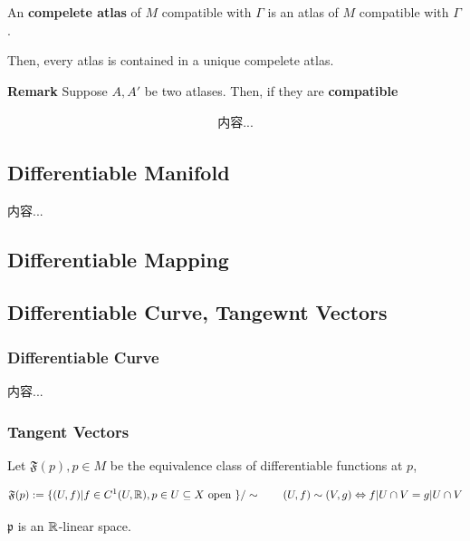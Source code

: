 \documentclass[Total.tex]{subfiles}
\begin{document}
				\begin{Def}
					An \textbf{compelete atlas} of $M$ compatible with $\Gamma$ is an atlas of $M$ compatible with $\Gamma$.
				\end{Def}
				
				Then, every atlas is contained in a unique compelete atlas. 
				
				\textbf{Remark} Suppose $A,A'$ be two atlases. Then, if they are \textbf{compatible}
				
				\begin{gather*}
					内容...
				\end{gather*}
				
				\subsection{Differentiable Manifold}
				
				\begin{Def}
					内容...
				\end{Def}
				
				\subsection{Differentiable Mapping}
				
				\subsection{Differentiable Curve, Tangewnt Vectors}
					
					\subsubsection{Differentiable Curve}
					
						\begin{Def}
							内容...
						\end{Def}
						
					\subsubsection{Tangent Vectors}
						
						\begin{Def}
							Let $\mathfrak{F}(p),p\in M$ be the equivalence class of differentiable functions at $p$,
							
							\begin{gather*}
								\mathfrak{F}(p):=\{(U,f)|f\in C^1(U,\mathbb{R}),p\in U\subseteq X\mbox{ open }\}/\sim\qquad (U,f)\sim (V,g)\Leftrightarrow f|U\cap V=g|U\cap V
							\end{gather*}
							
							$\mathfrak{p}$ is an $\mathbb{R}$-linear space.
						\end{Def}
						
\end{document}
